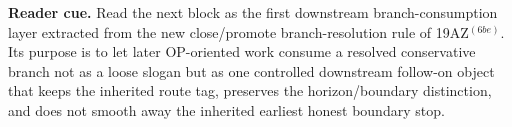 \noindent\textbf{Reader cue.} Read the next block as the first downstream branch-consumption layer extracted from the new close/promote branch-resolution rule of 19AZ$^{(6be)}$. Its purpose is to let later OP-oriented work consume a resolved conservative branch not as a loose slogan but as one controlled downstream follow-on object that keeps the inherited route tag, preserves the horizon/boundary distinction, and does not smooth away the inherited earliest honest boundary stop.

